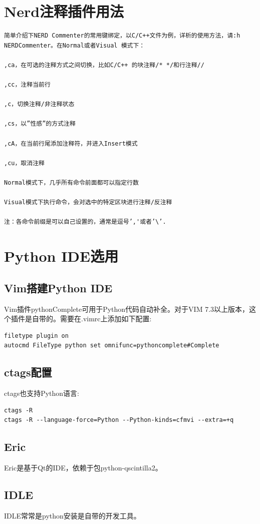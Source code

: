 {\section{Nerd注释插件用法}
\begin{verbatim}
简单介绍下NERD Commenter的常用键绑定，以C/C++文件为例，详析的使用方法，请:h NERDCommenter。在Normal或者Visual 模式下：

,ca，在可选的注释方式之间切换，比如C/C++ 的块注释/* */和行注释//

,cc，注释当前行

,c，切换注释/非注释状态

,cs，以”性感”的方式注释

,cA，在当前行尾添加注释符，并进入Insert模式

,cu，取消注释

Normal模式下，几乎所有命令前面都可以指定行数

Visual模式下执行命令，会对选中的特定区块进行注释/反注释

注：各命令前缀是可以自己设置的，通常是逗号’,'或者’\’.
\end{verbatim}
\section{Python IDE选用}

\subsection{Vim搭建Python IDE}
Vim插件pythonComplete可用于Python代码自动补全。对于VIM 7.3以上版本，这个插件是自带的。需要在.vimrc上添加如下配置:
\begin{verbatim}
filetype plugin on  
autocmd FileType python set omnifunc=pythoncomplete#Complete  
\end{verbatim}

\subsection{ctags配置}
ctags也支持Python语言:
\begin{verbatim}
ctags -R
ctags -R --language-force=Python --Python-kinds=cfmvi --extra=+q
\end{verbatim}

\subsection{Eric}
Eric是基于Qt的IDE，依赖于包python-qscintilla2。

\subsection{IDLE}
IDLE常常是python安装是自带的开发工具。

}
